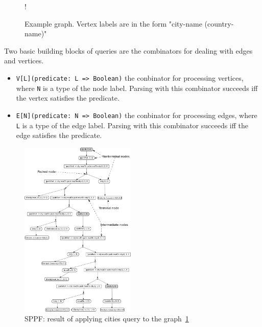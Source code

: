 
\begin{figure}[h]
 {!}
{
}
\caption{Example graph. Vertex labels are in the form "city-name (country-name)"}
\label{fig:graph}
\end{figure}

Two basic building blocks of queries are the combinators for dealing with edges and vertices.
\begin{itemize}
    \item \lstinline{V[L](predicate: L => Boolean)} the conbinator for processing vertices, where \lstinline{N} is a type of the node label. 
    Parsing with this combinator succeeds iff the vertex satisfies the predicate.
    \item \lstinline{E[N](predicate: N => Boolean)} the conbinator for processing edges, where \lstinline{L} is a type of the edge label. 
    Parsing with this combinator succeeds iff the edge satisfies the predicate.  
\end{itemize}

\begin{figure}[h]
\includegraphics[width=0.49\textwidth]{sppf}
\caption{SPPF: result of applying cities query to the graph~\ref{fig:graph}}
\label{fig:sppf}
\end{figure}

